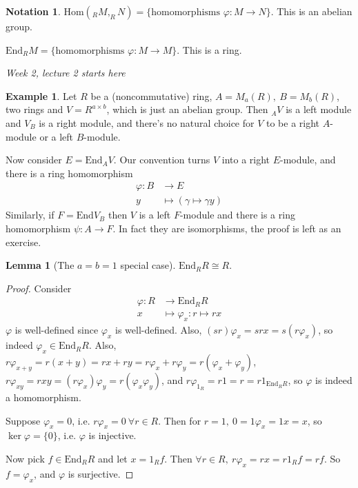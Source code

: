 \documentclass[a4paper]{article}
\newcommand{\End}{\text{End}}
\newcommand{\Hom}{\text{Hom}}
\theoremstyle{definition}
\newtheorem{lemma}[defn]{Lemma}
\newtheorem{example}[defn]{Example}
\newtheorem*{notation}{Notation}
\begin{document}
\begin{notation}
$\Hom(_RM,_RN)=\{\text{homomorphisms }\varphi:M\rightarrow N\}$. This is an abelian group.

$\End_RM=\{\text{homomorphisms }\varphi:M\rightarrow M\}$. This is a ring.
\end{notation}

\begin{flushright}
\textit{Week 2, lecture 2 starts here}
\end{flushright}

\begin{example}
Let $R$ be a (noncommutative) ring, $A=M_a(R),\ B=M_b(R)$, two rings and $V=R^{a\times b}$, which is just an abelian group. Then $_AV$ is a left module and $V_B$ is a right module, and there's no natural choice for $V$ to be a right $A$-module or a left $B$-module.

Now consider $E=\End_AV$. Our convention turns $V$ into a right $E$-module, and there is a ring homomorphism
\[
\begin{aligned}
\varphi:B&\rightarrow E \\
y&\mapsto (\gamma\mapsto\gamma y)
\end{aligned}
\]
Similarly, if $F=\End V_B$ then $V$ is a left $F$-module and there is a ring homomorphism $\psi:A\rightarrow F$. In fact they are isomorphisms, the proof is left as an exercise.
\end{example}

\begin{lemma}[The $a=b=1$ special case]
\label{lemma:EndRRisoR}
$\End _RR\cong R$.
\end{lemma}
\begin{proof}
Consider
\[
\begin{aligned}
\varphi:R&\rightarrow\End_RR\\
x&\mapsto \varphi_x:r\mapsto rx
\end{aligned}
\]
$\varphi$ is well-defined since $\varphi_x$ is well-defined. Also, $(sr)\varphi_x=srx=s(r\varphi_x)$, so indeed $\varphi_x\in\End_RR$. Also, $r\varphi_{x+y}=r(x+y)=rx+ry=r\varphi_x+r\varphi_y=r(\varphi_x+\varphi_y)$, $r\varphi_{xy}=rxy=(r\varphi_x)\varphi_y=r(\varphi_x\varphi_y)$, and $r\varphi_{1_R}=r1=r=r 1_{\End_RR}$, so $\varphi$ is indeed a homomorphism.

Suppose $\varphi_x=0$, i.e. $r\varphi_x=0 \ \forall r\in R$. Then for $r=1,\ 0=1\varphi_x=1x=x$, so $\ker\varphi=\{0\}$, i.e. $\varphi$ is injective.

Now pick $f\in\End_RR$ and let $x=1_Rf$. Then $\forall r\in R,\ r\varphi_x=rx=r1_Rf=rf$. So $f=\varphi_x$, and $\varphi$ is surjective.
\end{proof}
\end{document}
